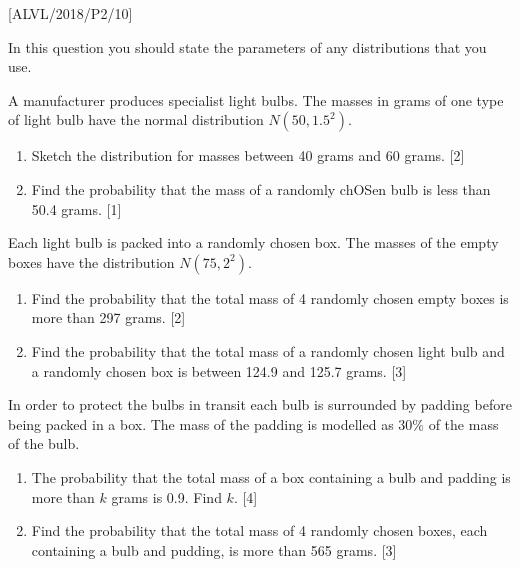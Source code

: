 \item {[}ALVL/2018/P2/10{]}

In this question you should state the parameters of any distributions
that you use. 

A manufacturer produces specialist light bulbs. The masses in grams
of one type of light bulb have the normal distribution $N\left(50,1.5^{2}\right)$. 
\begin{enumerate}
\item Sketch the distribution for masses between 40 grams and 60 grams.
\hfill{}{[}2{]}
\item Find the probability that the mass of a randomly chOSen bulb is less
than 50.4 grams. \hfill{}{[}1{]}
\end{enumerate}
Each light bulb is packed into a randomly chosen box. The masses of
the empty boxes have the distribution $N\left(75,2^{2}\right)$. 
\begin{enumerate}
\item Find the probability that the total mass of 4 randomly chosen empty
boxes is more than 297 grams.\hfill{} {[}2{]}
\item Find the probability that the total mass of a randomly chosen light
bulb and a randomly chosen box is between 124.9 and 125.7 grams.\hfill{}
{[}3{]}
\end{enumerate}
In order to protect the bulbs in transit each bulb is surrounded by
padding before being packed in a box. The mass of the padding is modelled
as 30\% of the mass of the bulb.
\begin{enumerate}
\item The probability that the total mass of a box containing a bulb and
padding is more than $k$ grams is 0.9. Find $k$. \hfill{}{[}4{]}
\item Find the probability that the total mass of 4 randomly chosen boxes,
each containing a bulb and pudding, is more than 565 grams. \hfill{}{[}3{]}
\end{enumerate}
